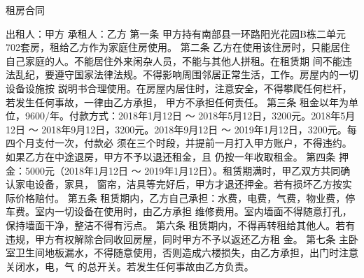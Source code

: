 \documentclass[12pt,a4paper]{article}
\begin{document}
\begin{center}
  \begin{Huge}
    租房合同
  \end{Huge}
\end{center}
出租人：甲方
\newline{}
承租人：乙方
\newline{}
第一条
\newline{}
甲方持有南部县一环路阳光花园B栋二单元702套房，租给乙方\hspace{1cm}作为家庭住房使用。
\newline{}
\newline{}
第二条
\newline{}
乙方在使用该住房时，只能居住自己家庭的人。不能居住外来闲杂人员，不能与其他人拼租。在租赁期
间不能违法乱纪，要遵守国家法律法规。不得影响周围邻居正常生活，工作。房屋内的一切设备设施按
説明书合理使用。在房屋内居住时，注意安全，不得攀爬任何栏杆，若发生任何事故，一律由乙方承担，
甲方不承担任何责任。
\newline{}
\newline{}
第三条
\newline{}
租金以年为单位，9600/年。付款方式：2018年1月12日 ～ 2018年5月12日，3200元。2018年5月12日
～ 2018年9月12日，3200元。2018年9月12日 ～ 2019年1月12日，3200元。每四个月支付一次，付款必
须在三个时段，并提前一月打入甲方账户，不得违约。如果乙方在中途退房，甲方不予以退还租金，且
仍按一年收取租金。
\newline{}
\newline{}
第四条
\newline{}
押金：5000元（2018年1月12日 ～ 2019年1月12日）。租赁期满时，甲乙双方共同确认家电设备，家具，
窗帘，洁具等完好后，甲方才退还押金。若有损坏乙方按实际价格赔付。
\newline{}
\newline{}
第五条
\newline{}
租赁期内，乙方自己承担：水费，电费，气费，物业费，停车费。室内一切设备在使用时，由乙方承担
维修费用。室内墙面不得随意打孔，保持墙面干净，整洁不得有污点。
\newline{}
\newline{}
第六条
\newline{}
租赁期内，不得再转租给其他人。若有违规，甲方有权解除合同收回房屋，同时甲方不予以返还乙方租
金。
\newline{}
\newline{}
第七条
\newline{}
主卧室卫生间地板漏水，不得随意使用，否则造成六楼损失，由乙方承担，出门时注意关闭水，电，气
的总开关。若发生任何事故由乙方负责。
\end{document}
